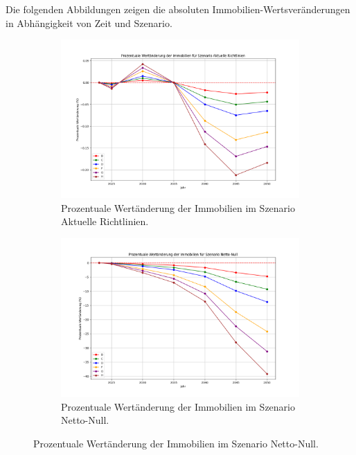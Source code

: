 Die folgenden Abbildungen zeigen die absoluten Immobilien-Wertsveränderungen in Abhängigkeit von Zeit und Szenario.
\begin{figure}[htbp]
    \centering
    \begin{subfigure}[b]{0.48\textwidth}
        \centering
        \includegraphics[width=\textwidth]{figures/Aktuelle Richtlinien_percentage_change_plot.png}
        \caption{Prozentuale Wertänderung der Immobilien im Szenario Aktuelle Richtlinien.}
        \label{fig:aktuelle_richtlinien}
    \end{subfigure}
    \hfill
    \begin{subfigure}[b]{0.48\textwidth}
        \centering
        \includegraphics[width=\textwidth]{figures/Netto-Null_percentage_change_plot.png}
        \caption{Prozentuale Wertänderung der Immobilien im Szenario Netto-Null.}
        \label{fig:netto_null}
    \end{subfigure}
    

\end{figure}
